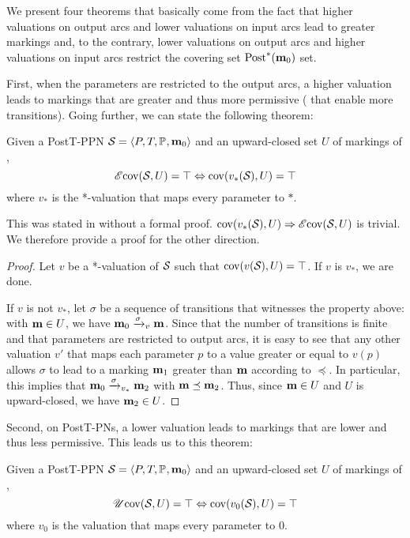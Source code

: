 We present four theorems that basically come from the fact that
higher valuations on output arcs and lower valuations on input arcs lead to greater markings and, to the contrary,
lower valuations on output arcs and higher valuations on input arcs restrict the covering set $\operatorname{Post}^*_{{}}(\mathbf{m}_0)$ set.

First, when the parameters are restricted to the output arcs, a higher valuation leads to markings that are greater and thus more permissive ( that enable more transitions).
Going further, we can state the following theorem:
\begin{theo}
  \label{theo:post-e-star-val}
  Given a PostT-\ac{PPN} $\defPPN$ and an upward-closed set $U$ of markings of \namePPN, \[\operatorname{\mathscr{E}cov}(\mathcal{S}_{{}}, U) = \top \Leftrightarrow \operatorname{cov}(v_*(\mathcal{S}_{{}}),U) = \top\] where $v_*$ is the *-valuation that maps every parameter to $*$.
\end{theo}

This was stated in \cite{David17} without a formal proof.
$\operatorname{cov}(v_*(\mathcal{S}_{{}}),U) \Rightarrow \operatorname{\mathscr{E}cov}(\mathcal{S}_{{}}, U)$ is trivial.
We therefore provide a proof for the other direction.


\begin{proof}
  Let $v$ be a *-valuation of $\mathcal{S}_{{}}$ such that $\operatorname{cov}(v(\mathcal{S}_{{}}),U) = \top$.
  If $v$ is $v_*$, we are done.

  If $v$ is not $v_*$, let $\sigma$ be a sequence of transitions that witnesses the property above: with $\mathbf{m} \in U$, we have $\mari \fire[\val]{\sigma} \mar$.
  Since that the number of transitions is finite and that parameters are restricted to output arcs, it is easy to see that any other valuation $v'$ that maps each parameter $p$ to a value greater or equal to $v(p)$ allows $\sigma$ to lead to a marking $\mathbf{m}_1$ greater than $\mathbf{m}$ according to $\preceq$.
  In particular, this implies that $\mari \fire[\val_*]{\sigma} \mar_2$ with $\mathbf{m} \preceq \mathbf{m}_2$.
  Thus, since $\mathbf{m} \in U$ and $U$ is upward-closed, we have $\mathbf{m}_2 \in U$.
\end{proof}

Second, on PostT-\acp{PN}, a lower valuation leads to markings that are lower and thus less permissive.
This leads us to this theorem:
\begin{theo}
  \label{theo:post-u-zero-val}
  Given a PostT-\ac{PPN} $\defPPN$ and an upward-closed set $U$ of markings of \namePPN, \[\operatorname{\mathscr{U}cov}(\mathcal{S}_{{}}, U) = \top \Leftrightarrow \operatorname{cov}(v_0(\mathcal{S}_{{}}),U) = \top\] where $v_0$ is the valuation that maps every parameter to $0$.
\end{theo}


